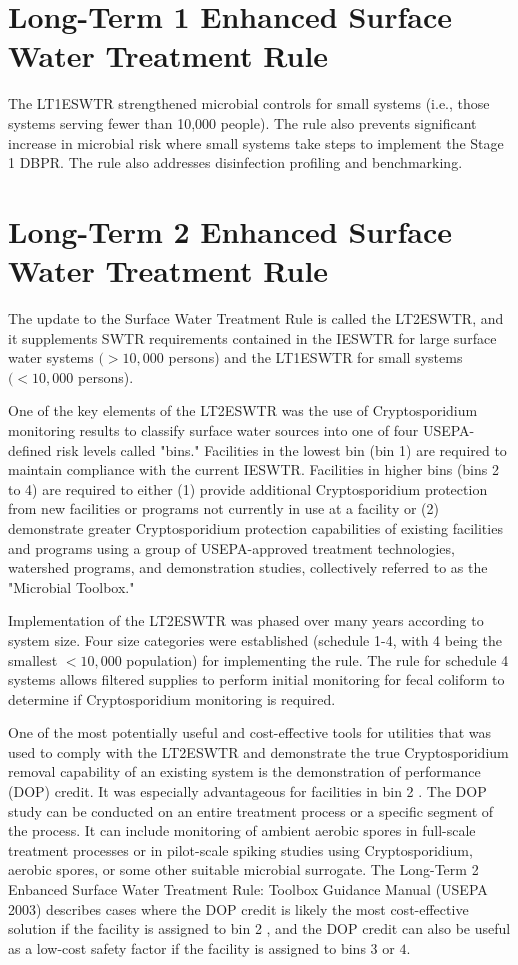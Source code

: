 \documentclass[10pt]{article}
\begin{document}
\section{Long-Term 1 Enhanced Surface Water Treatment Rule}
The LT1ESWTR strengthened microbial controls for small systems (i.e., those systems serving fewer than 10,000 people). The rule also prevents significant increase in microbial risk where small systems take steps to implement the Stage 1 DBPR. The rule also addresses disinfection profiling and benchmarking.

\section{Long-Term 2 Enhanced Surface Water Treatment Rule}
The update to the Surface Water Treatment Rule is called the LT2ESWTR, and it supplements SWTR requirements contained in the IESWTR for large surface water systems $(>10,000$ persons) and the LT1ESWTR for small systems $(<10,000$ persons).

One of the key elements of the LT2ESWTR was the use of Cryptosporidium monitoring results to classify surface water sources into one of four USEPA-defined risk levels called "bins." Facilities in the lowest bin (bin 1) are required to maintain compliance with the current IESWTR. Facilities in higher bins (bins 2 to 4) are required to either (1) provide additional Cryptosporidium protection from new facilities or programs not currently in use at a facility or (2) demonstrate greater Cryptosporidium protection capabilities of existing facilities and programs using a group of USEPA-approved treatment technologies, watershed programs, and demonstration studies, collectively referred to as the "Microbial Toolbox."

Implementation of the LT2ESWTR was phased over many years according to system size. Four size categories were established (schedule 1-4, with 4 being the smallest $<10,000$ population) for implementing the rule. The rule for schedule 4 systems allows filtered supplies to perform initial monitoring for fecal coliform to determine if Cryptosporidium monitoring is required.

One of the most potentially useful and cost-effective tools for utilities that was used to comply with the LT2ESWTR and demonstrate the true Cryptosporidium removal capability of an existing system is the demonstration of performance (DOP) credit. It was especially advantageous for facilities in bin 2 . The DOP study can be conducted on an entire treatment process or a specific segment of the process. It can include monitoring of ambient aerobic spores in full-scale treatment processes or in pilot-scale spiking studies using Cryptosporidium, aerobic spores, or some other suitable microbial surrogate. The Long-Term 2 Enbanced Surface Water Treatment Rule: Toolbox Guidance Manual (USEPA 2003) describes cases where the DOP credit is likely the most cost-effective solution if the facility is assigned to bin 2 , and the DOP credit can also be useful as a low-cost safety factor if the facility is assigned to bins 3 or $4 .$
\end{document}
